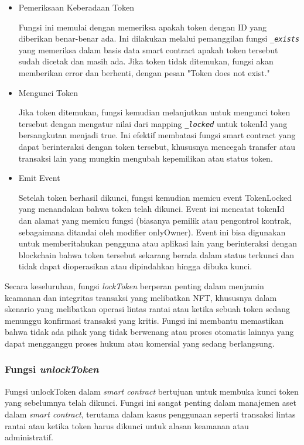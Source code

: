 \begin{itemize}
    \item Pemeriksaan Keberadaan Token
    
    Fungsi ini memulai dengan memeriksa apakah token dengan ID yang diberikan benar-benar ada. Ini dilakukan melalui pemanggilan fungsi \emph{\texttt{\_exists}} yang memeriksa dalam basis data smart contract apakah token tersebut sudah dicetak dan masih ada. Jika token tidak ditemukan, fungsi akan memberikan error dan berhenti, dengan pesan "Token does not exist."

    \item Mengunci Token
    
    Jika token ditemukan, fungsi kemudian melanjutkan untuk mengunci token tersebut dengan mengatur nilai dari mapping \emph{\texttt{\_locked}} untuk tokenId yang bersangkutan menjadi true. Ini efektif membatasi fungsi smart contract yang dapat berinteraksi dengan token tersebut, khususnya mencegah transfer atau transaksi lain yang mungkin mengubah kepemilikan atau status token.

    \item Emit Event
    
    Setelah token berhasil dikunci, fungsi kemudian memicu event TokenLocked yang menandakan bahwa token telah dikunci. Event ini mencatat tokenId dan alamat yang memicu fungsi (biasanya pemilik atau pengontrol kontrak, sebagaimana ditandai oleh modifier onlyOwner). Event ini bisa digunakan untuk memberitahukan pengguna atau aplikasi lain yang berinteraksi dengan blockchain bahwa token tersebut sekarang berada dalam status terkunci dan tidak dapat dioperasikan atau dipindahkan hingga dibuka kunci.
\end{itemize}

Secara keseluruhan, fungsi \emph{lockToken} berperan penting dalam menjamin keamanan dan integritas transaksi yang melibatkan NFT, khususnya dalam skenario yang melibatkan operasi lintas rantai atau ketika sebuah token sedang menunggu konfirmasi transaksi yang kritis. Fungsi ini membantu memastikan bahwa tidak ada pihak yang tidak berwenang atau proses otomatis lainnya yang dapat mengganggu proses hukum atau komersial yang sedang berlangsung.

\subsubsection{Fungsi \emph{unlockToken}}
Fungsi unlockToken dalam \emph{smart contract} bertujuan untuk membuka kunci token yang sebelumnya telah dikunci. Fungsi ini sangat penting dalam manajemen aset dalam \emph{smart contract}, terutama dalam kasus penggunaan seperti transaksi lintas rantai atau ketika token harus dikunci untuk alasan keamanan atau administratif.

